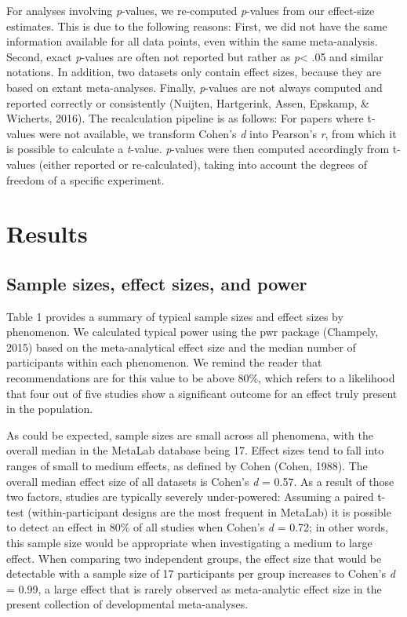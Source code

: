\documentclass[english,floatsintext,man]{apa6}
\begin{document}
For analyses involving \emph{p}-values, we re-computed \emph{p}-values
from our effect-size estimates. This is due to the following reasons:
First, we did not have the same information available for all data
points, even within the same meta-analysis. Second, exact
\emph{p}-values are often not reported but rather as \emph{p}\textless{}
.05 and similar notations. In addition, two datasets only contain effect
sizes, because they are based on extant meta-analyses. Finally,
\emph{p}-values are not always computed and reported correctly or
consistently (Nuijten, Hartgerink, Assen, Epskamp, \& Wicherts, 2016).
The recalculation pipeline is as follows: For papers where t-values were
not available, we transform Cohen's \emph{d} into Pearson's \emph{r},
from which it is possible to calculate a \emph{t}-value. \emph{p}-values
were then computed accordingly from t-values (either reported or
re-calculated), taking into account the degrees of freedom of a specific
experiment.

\section{Results}\label{results}

\subsection{Sample sizes, effect sizes, and
power}\label{sample-sizes-effect-sizes-and-power}

Table 1 provides a summary of typical sample sizes and effect sizes by
phenomenon. We calculated typical power using the pwr package (Champely,
2015) based on the meta-analytical effect size and the median number of
participants within each phenomenon. We remind the reader that
recommendations are for this value to be above 80\%, which refers to a
likelihood that four out of five studies show a significant outcome for
an effect truly present in the population.

As could be expected, sample sizes are small across all phenomena, with
the overall median in the MetaLab database being 17. Effect sizes tend
to fall into ranges of small to medium effects, as defined by Cohen
(Cohen, 1988). The overall median effect size of all datasets is Cohen's
\emph{d} = 0.57. As a result of those two factors, studies are typically
severely under-powered: Assuming a paired t-test (within-participant
designs are the most frequent in MetaLab) it is possible to detect an
effect in 80\% of all studies when Cohen's \emph{d} = 0.72; in other
words, this sample size would be appropriate when investigating a medium
to large effect. When comparing two independent groups, the effect size
that would be detectable with a sample size of 17 participants per group
increases to Cohen's \emph{d} = 0.99, a large effect that is rarely
observed as meta-analytic effect size in the present collection of
developmental meta-analyses.
\end{document}
